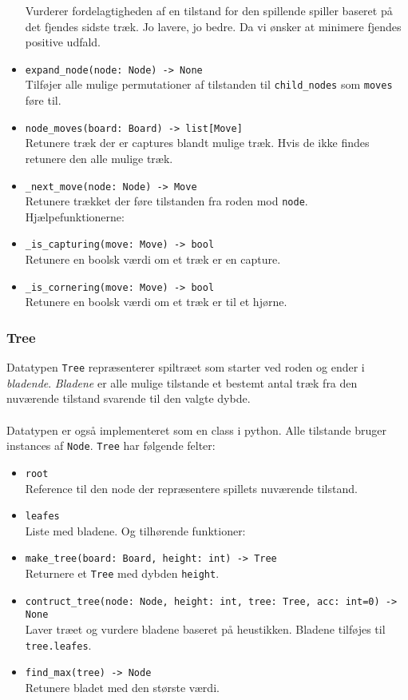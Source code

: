 \begin{itemize}
    Vurderer fordelagtigheden af en tilstand for den spillende spiller baseret på det fjendes sidste træk. Jo lavere, jo bedre.
    Da vi ønsker at minimere fjendes positive udfald.
    \item \texttt{expand\_node(node: Node) -> None}\\
    Tilføjer alle mulige permutationer af tilstanden til \texttt{child\_nodes} som \texttt{moves} føre til.
    \item \texttt{node\_moves(board: Board) -> list[Move]}\\
    Retunere træk der er captures blandt mulige træk. Hvis de ikke findes retunere den alle mulige træk.
    \item \texttt{\_next\_move(node: Node) -> Move}\\
    Retunere trækket der føre tilstanden fra roden mod \texttt{node}.
    \bigbreak
    Hjælpefunktionerne:
    \item \texttt{\_is\_capturing(move: Move) -> bool}\\
    Retunere en boolsk værdi om et træk er en capture.
    \item \texttt{\_is\_cornering(move: Move) -> bool}\\
    Retunere en boolsk værdi om et træk er til et hjørne.
\end{itemize}

\newpage
\subsubsection{Tree}
Datatypen \texttt{Tree} repræsenterer spiltræet som starter ved roden og ender i \textit{bladende}.
\textit{Bladene} er alle mulige tilstande et bestemt antal træk fra den nuværende tilstand svarende til
den valgte dybde.
\\
\\
Datatypen er også implementeret som en class i python. Alle tilstande bruger instances af \texttt{Node}.
\bigbreak
\texttt{Tree} har følgende felter:
\begin{itemize}
    \item \texttt{root}\\
    Reference til den node der repræsentere spillets nuværende tilstand.
    \item \texttt{leafes}\\
    Liste med bladene.
    \bigbreak
    Og tilhørende funktioner:
    \item \texttt{make\_tree(board: Board, height: int) -> Tree}\\
    Returnere et \texttt{Tree} med dybden \texttt{height}.
    \item \texttt{contruct\_tree(node: Node, height: int, tree: Tree, acc: int=0) -> None}\\
    Laver træet og vurdere bladene baseret på heustikken. Bladene tilføjes til \texttt{tree.leafes}.
    \item \texttt{find\_max(tree) -> Node}\\
    Retunere bladet med den største værdi.
\end{itemize}

